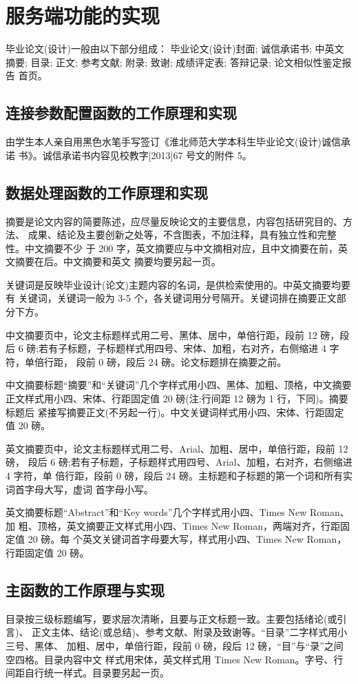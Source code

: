 \chapter{服务端功能的实现}
毕业论文(设计)一般由以下部分组成：\cite{1}
\subitem 毕业论文(设计)封面;
\subitem 诚信承诺书;
\subitem 中英文摘要;
\subitem 目录;
\subitem 正文;
\subitem 参考文献;
\subitem 附录;
\subitem 致谢;
\subitem 成绩评定表;
\subitem 答辩记录;
\subitem 论文相似性鉴定报告 首页。

\section{连接参数配置函数的工作原理和实现}

由学生本人亲自用黑色水笔手写签订《淮北师范大学本科生毕业论文(设计)诚信承诺 书》。诚信承诺书内容见校教字[2013]67 号文的附件 5。

\section{数据处理函数的工作原理和实现}

摘要是论文内容的简要陈述，应尽量反映论文的主要信息，内容包括研究目的、方法、 成果、结论及主要创新之处等，不含图表，不加注释，具有独立性和完整性。中文摘要不少 于 200 字，英文摘要应与中文摘相对应，且中文摘要在前，英文摘要在后。中文摘要和英文 摘要均要另起一页。

关键词是反映毕业设计(论文)主题内容的名词，是供检索使用的。中英文摘要均要有 关键词，关键词一般为 3-5 个，各关键词用分号隔开。关键词排在摘要正文部分下方。

中文摘要页中，论文主标题样式用二号、黑体、居中，单倍行距，段前 12 磅，段后 6 磅;若有子标题，子标题样式用四号、宋体、加粗，右对齐，右侧缩进 4 字符，单倍行距， 段前 0 磅，段后 24 磅。论文标题排在摘要之前。

中文摘要标题“摘要”和“关键词”几个字样式用小四、黑体、加粗、顶格，中文摘要 正文样式用小四、宋体、行距固定值 20 磅(注:行间距 12 磅为 1 行，下同)。摘要标题后 紧接写摘要正文(不另起一行)。中文关键词样式用小四、宋体、行距固定值 20 磅。

英文摘要页中，论文主标题样式用二号、Arial、加粗、居中，单倍行距，段前 12 磅， 段后 6 磅;若有子标题，子标题样式用四号、Arial、加粗，右对齐，右侧缩进 4 字符，单 倍行距，段前 0 磅，段后 24 磅。主标题和子标题的第一个词和所有实词首字母大写，虚词 首字母小写。

英文摘要标题“Abstract”和“Key words”几个字样式用小四、Times New Roman、加 粗、顶格，英文摘要正文样式用小四、Times New Roman，两端对齐，行距固定值 20 磅。每 个英文关键词首字母要大写，样式用小四、Times New Roman，行距固定值 20 磅。

\section{主函数的工作原理与实现}
目录按三级标题编写，要求层次清晰，且要与正文标题一致。主要包括绪论(或引言)、 正文主体、结论(或总结)、参考文献、附录及致谢等。“目录”二字样式用小三号、黑体、 加粗、居中，单倍行距，段前 0 磅，段后 12 磅，“目”与“录”之间空四格。目录内容中文 样式用宋体，英文样式用 Times New Roman。字号、行间距自行统一样式。目录要另起一页。

